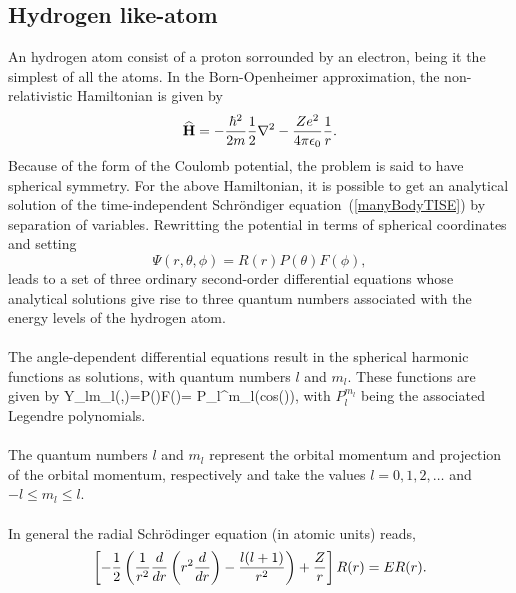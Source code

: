 \subsection{Hydrogen like-atom}
An hydrogen atom consist of a proton sorrounded by an electron, being it the simplest of all the atoms. In the Born-Openheimer approximation, the non-relativistic Hamiltonian is given by
\begin{equation}
 {\bf\widehat{H}} = -\frac{\hbar^2}{2 m} \frac{1}{2} \nabla^2 - \frac{Z e^2}{4 \pi \epsilon_0}\frac{1}{r}.
\end{equation}
Because of the form of the Coulomb potential, the problem is said to have spherical symmetry. For the above Hamiltonian, it is possible to get an analytical solution of the time-independent Schr\"ondiger equation~(\ref{manyBodyTISE}) by separation of variables. Rewritting the potential in terms of spherical coordinates and setting 
\begin{equation}
\Psi(r, \theta, \phi) = R(r) P(\theta) F(\phi), 
\end{equation}
leads to a set of three ordinary second-order differential equations whose analytical solutions give rise to three quantum numbers associated with the energy levels of the hydrogen atom.\\
\\
The angle-dependent differential equations result in the spherical harmonic
functions as solutions, with quantum numbers $l$ and $m_l$. These functions are given by\cite{Zettili2001}
\be
    Y_{lm_l}(\theta,\phi)=P(\theta)F(\phi)=
                      P_l^{m_l}(cos(\theta)),
\ee
with $P_l^{m_l}$ being the associated Legendre polynomials.\\
\\
\noindent
The quantum numbers $l$ and $m_l$ represent the orbital momentum and projection of
the orbital momentum, respectively and take the values $l=0,1,2,\dots$ and $-l \leq m_l \leq l$.\\
\\
In general the radial Schr\"odinger equation (in atomic units) reads,
\begin{equation}
\left[ - \frac{1}{2} \left({1 \over r^2}\frac{d}{dr}\left(r^2 \frac{d}{dr}\right) - {l(l+1)\over r^2} \right) + \frac{Z}{r} \right] R(r) = E R(r).
\end{equation}


